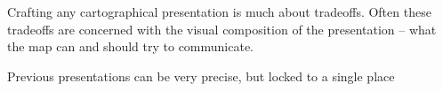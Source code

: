 
Crafting any cartographical presentation is much about tradeoffs.
Often these tradeoffs are concerned with the visual composition of the presentation --
what the map can and should try to communicate.

Previous presentations can be very precise, but locked to a single place

